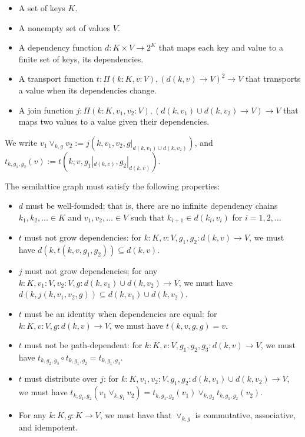 \documentclass{article}
\begin{document}
        \begin{itemize}
            \item A set of keys $K$.
            \item A nonempty set of values $V$.
            \item A dependency function $d : K \times V \rightarrow 2^K$ that maps each key and value to a finite set of keys, its dependencies.
            \item A transport function $t : \Pi (k : K, v : V), (d(k, v) \rightarrow V)^2 \rightarrow V$ that transports a value when its dependencies change.
            \item A join function $j : \Pi (k : K, v_1, v_2 : V), (d(k, v_1) \cup d(k, v_2) \rightarrow V) \rightarrow V$ that maps two values to a value given their dependencies.
        \end{itemize}

        We write $v_1 \vee_{k, g} v_2 := j(k, v_1, v_2, g|_{d(k, v_1) \cup d(k, v_2)})$, and $t_{k, g_1, g_2}(v) := t(k, v, g_1|_{d(k, v)}, g_2|_{d(k, v)})$.

        The semilattice graph must satisfy the following properties:

        \begin{itemize}
            \item $d$ must be well-founded; that is, there are no infinite dependency chains $k_1, k_2, \ldots \in K$ and $v_1, v_2, \ldots \in V$ such that $k_{i+1} \in d(k_i, v_i)$ for $i = 1, 2, \ldots$
            \item $t$ must not grow dependencies: for $k : K, v : V, g_1, g_2 : d(k, v) \rightarrow V$, we must have $d(k, t(k, v, g_1, g_2)) \subseteq d(k, v)$.
            \item $j$ must not grow dependencies; for any $k : K, v_1 : V, v_2: V, g: d(k, v_1) \cup d(k, v_2) \rightarrow V$, we must have $d(k, j(k, v_1, v_2, g)) \subseteq d(k, v_1) \cup d(k, v_2)$.
            \item $t$ must be an identity when dependencies are equal: for $k : K, v : V, g : d(k, v) \rightarrow V$, we must have $t(k, v, g, g) = v$.
            \item $t$ must not be path-dependent: for $k : K, v : V, g_1, g_2, g_3: d(k, v) \rightarrow V$, we must have $t_{k, g_2, g_3} \circ t_{k, g_1, g_2} = t_{k, g_1, g_3}$.
            \item $t$ must distribute over $j$: for $k : K, v_1, v_2 : V, g_1, g_2 : d(k, v_1) \cup d(k, v_2) \rightarrow V$, we must have $t_{k, g_1, g_2}(v_1 \vee_{k, g_1} v_2) = t_{k, g_1, g_2}(v_1) \vee_{k, g_2} t_{k, g_1, g_2}(v_2)$.
            \item For any $k: K, g : K \rightarrow V$, we must have that $\vee_{k, g}$ is commutative, associative, and idempotent.
        \end{itemize}
\end{document}
